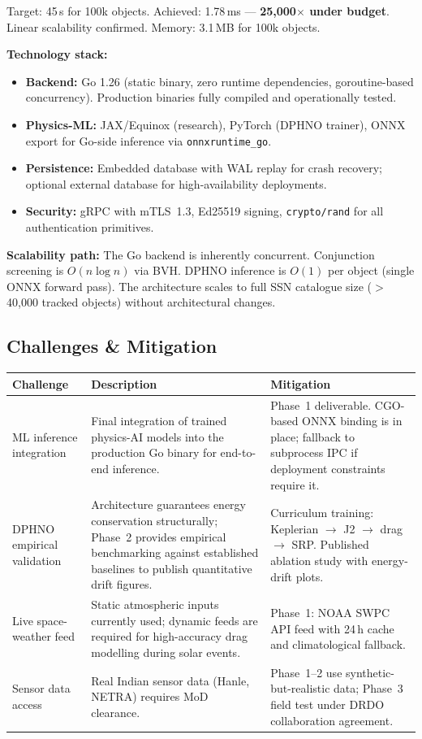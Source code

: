 \documentclass[11pt,a4paper]{article}
\begin{document}
\vspace{0.5em}
Target: 45\,s for 100k objects. Achieved: 1.78\,ms --- \textbf{25,000$\times$ under budget}.
Linear scalability confirmed. Memory: 3.1\,MB for 100k objects.

\textbf{Technology stack:}
\begin{itemize}
\item \textbf{Backend:} Go 1.26 (static binary, zero runtime dependencies,
      goroutine-based concurrency). Production binaries fully compiled and
      operationally tested.
\item \textbf{Physics-ML:} JAX/Equinox (research), PyTorch (DPHNO trainer),
      ONNX export for Go-side inference via \texttt{onnxruntime\_go}.
\item \textbf{Persistence:} Embedded database with WAL replay for crash recovery;
      optional external database for high-availability deployments.
\item \textbf{Security:} gRPC with mTLS~1.3, Ed25519 signing,
      \texttt{crypto/rand} for all authentication primitives.
\end{itemize}

\textbf{Scalability path:} The Go backend is inherently concurrent.
Conjunction screening is $O(n \log n)$ via BVH. DPHNO inference is
$O(1)$ per object (single ONNX forward pass). The architecture scales
to full SSN catalogue size ($>$40,000 tracked objects) without
architectural changes.

\subsection{Challenges \& Mitigation}

\renewcommand{\arraystretch}{1.3}
\begin{tabularx}{\textwidth}{l Y Y}
\toprule
\textbf{Challenge} & \textbf{Description} & \textbf{Mitigation} \\
\midrule
ML inference integration &
Final integration of trained physics-AI models into the production Go binary
for end-to-end inference. &
Phase~1 deliverable. CGO-based ONNX binding is in place;
fallback to subprocess IPC if deployment constraints require it. \\
\addlinespace
DPHNO empirical validation &
Architecture guarantees energy conservation structurally;
Phase~2 provides empirical benchmarking against established baselines
to publish quantitative drift figures. &
Curriculum training: Keplerian $\to$ J2 $\to$ drag $\to$ SRP.
Published ablation study with energy-drift plots. \\
\addlinespace
Live space-weather feed &
Static atmospheric inputs currently used; dynamic feeds are required
for high-accuracy drag modelling during solar events. &
Phase~1: NOAA SWPC API feed with 24\,h cache and climatological fallback. \\
\addlinespace
Sensor data access &
Real Indian sensor data (Hanle, NETRA) requires MoD clearance. &
Phase~1--2 use synthetic-but-realistic data; Phase~3 field test
under DRDO collaboration agreement. \\
\bottomrule
\end{tabularx}
\end{document}
